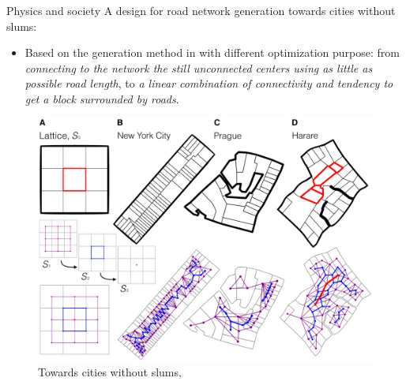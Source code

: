 \begin{frame}{Physics and society}
    A design for road network generation towards cities without slums: 
    \begin{itemize}
        \item Based on the generation method in \cite{PhysRevLett.100.138702} with different optimization purpose: from \textit{connecting to the network the still unconnected centers using as little as possible road length}, to \textit{a linear combination of connectivity and tendency to get a block surrounded by roads}.
    \end{itemize}
    \begin{figure}
        \centering
        \includegraphics[width = 0.45\linewidth]{Pics/F1.large.jpg}
        \caption{Towards cities without slums, \cite{brelsford2018toward}}
        \label{fig:withoutslum}
    \end{figure}
\end{frame}

